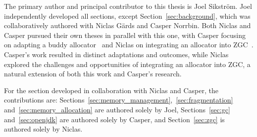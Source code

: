 
The primary author and principal contributor to this thesis is Joel Sikström. Joel independently developed all sections, except Section~\ref{sec:background}, which was collaboratively authored with Niclas Gärds and Casper Norrbin. Both Niclas and Casper pursued their own theses in parallel with this one, with Casper focusing on adapting a buddy allocator~\cite{casper} and Niclas on integrating an allocator into ZGC~\cite{niclas}. Casper's work resulted in distinct adaptations and outcomes, while Niclas explored the challenges and opportunities of integrating an allocator into ZGC, a natural extension of both this work and Casper's research.

For the section developed in collaboration with Niclas and Casper, the contributions are: Sections~\ref{sec:memory_management},~\ref{sec:fragmentation} and~\ref{sec:memory_allocation} are authored solely by Joel, Sections~\ref{sec:gc} and~\ref{sec:openjdk} are authored solely by Casper, and Section~\ref{sec:zgc} is authored solely by Niclas.

